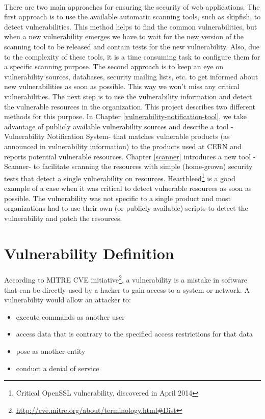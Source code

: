 \paragraph{}
There are two main approaches for ensuring the security of web applications. The first approach is to use the available automatic scanning tools, such as skipfish, to detect vulnerabilities. This method helps to find the common vulnerabilities, but when a new vulnerability emerges we have to wait for the new version of the scanning tool to be released and contain tests for the new vulnerability. Also, due to the complexity of these tools, it is a time consuming task to configure them for a specific scanning purpose. 
The second approach is to keep an eye on vulnerability sources, databases, security mailing lists, etc. to get informed about new vulnerabilities as soon as possible. This way we won't miss any critical vulnerabilities. The next step is to use the vulnerability information and detect the vulnerable resources in the organization. This project describes two different methods for this purpose. In Chapter \ref{vulnerability-notification-tool}, we take advantage of publicly available vulnerability sources and describe a tool -Vulnerability Notification System- that matches  vulnerable products (as announced in vulnerability information) to the products used at CERN and reports potential vulnerable resources. Chapter \ref{scanner} introduces a new tool -Scanner- to facilitate scanning the resources with simple (home-grown) security tests that detect a single vulnerability on resources. Heartbleed\footnote{Critical OpenSSL vulnerability, discovered in April 2014} is a good example of a case when it was critical to detect vulnerable resources as soon as possible. The vulnerability was not specific to a single product and most organizations had to use their own (or publicly available) scripts to detect the vulnerability and patch the resources.

\section{Vulnerability Definition}
\paragraph{}
According to MITRE CVE initiative\footnote{\url{http://cve.mitre.org/about/terminology.html\#Dist}}, a vulnerability is a mistake in software that can be directly used by a hacker to gain access to a system or network. A vulnerability would allow an attacker to:
\begin{itemize}
\item execute commands as another user
\item access data that is contrary to the specified access restrictions for that data
\item pose as another entity
\item conduct a denial of service
\end{itemize}

